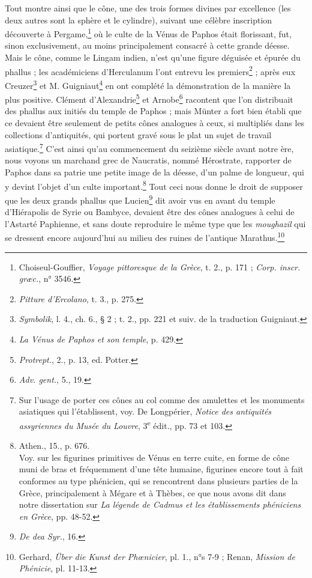 \documentclass[a4paper, 11pt, oneside]{article}
\begin{document}
Tout montre ainsi que le cône, une des trois formes divines par excellence (les deux autres sont la sphère et le cylindre), suivant une célèbre inscription découverte à Pergame,\footnote{Choiseul-Gouffier, \emph{Voyage pittoresque de la Grèce}, t. 2., p. 171 ; \emph{Corp. inscr. græc.}, n° 3546.} où le culte de la Vénus de Paphos était florissant, fut, sinon exclusivement, au moins principalement consacré à cette grande déesse. Mais le cône, comme le Lingam indien, n'est qu'une figure déguisée et épurée du phallus ; les académiciens d'Herculanum l'ont entrevu les premiers\footnote{\emph{Pitture d'Ercolano}, t. 3., p. 275.} ; après eux Creuzer\footnote{\emph{Symbolik}, l. 4., ch. 6., § 2 ; t. 2., pp. 221 et suiv. de la traduction Guigniaut.} et M. Guigniaut\footnote{\emph{La Vénus de Paphos et son temple}, p. 429.} en ont complété la démonstration de la manière la plus positive. Clément d'Alexandrie\footnote{\emph{Protrept.}, 2., p. 13, ed. Potter.} et Arnobe\footnote{\emph{Adv. gent.}, 5., 19.} racontent que l'on distribuait des phallus aux initiés du temple de Paphos ; mais Münter a fort bien établi que ce devaient être seulement de petits cônes analogues à ceux, si multipliés dans les collections d'antiquités, qui portent gravé sous le plat un sujet de travail asiatique.\footnote{Sur l'usage de porter ces cônes au col comme des amulettes et les monuments asiatiques qui l'établissent, voy. De Longpérier, \emph{Notice des antiquités assyriennes du Musée du Louvre}, 3\textsuperscript{e} édit., pp. 73 et 103.} C'est ainsi qu'au commencement du seizième siècle avant notre ère, nous voyons un marchand grec de Naucratis, nommé Hérostrate, rapporter de Paphos dans sa patrie une petite image de la déesse, d'un palme de longueur, qui y devint l'objet d'un culte important.\footnote{Athen., 15., p. 676.\\\hspace*{5mm}Voy. sur les figurines primitives de Vénus en terre cuite, en forme de cône muni de bras et fréquemment d'une tête humaine, figurines encore tout à fait conformes au type phénicien, qui se rencontrent dans plusieurs parties de la Grèce, principalement à Mégare et à Thèbes, ce que nous avons dit dans notre dissertation sur \emph{La légende de Cadmus et les établissements phéniciens en Grèce}, pp. 48-52.} Tout ceci nous donne le droit de supposer que les deux grands phallus que Lucien\footnote{\emph{De dea Syr.}, 16.} dit avoir vus en avant du temple d'Hiérapolis de Syrie ou Bambyce, devaient être des cônes analogues à celui de l'Astarté Paphienne, et sans doute reproduire le même type que les \emph{moughazil} qui se dressent encore aujourd'hui au milieu des ruines de l'antique Marathus.\footnote{Gerhard, \emph{Über die Kunst der Phœnicier}, pl. 1., n°s 7-9 ; Renan, \emph{Mission de Phénicie}, pl. 11-13.}
\end{document}
